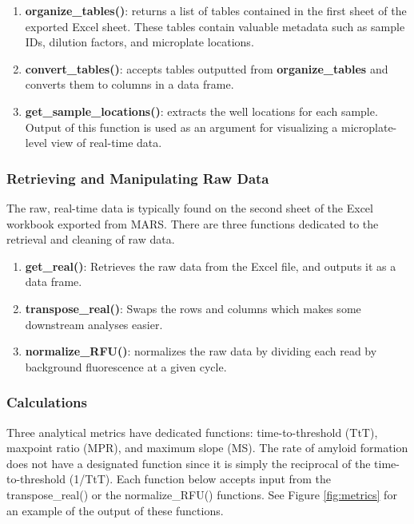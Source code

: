 \documentclass[preprint,12pt,a4paper]{elsarticle}
\begin{document}
            \begin{enumerate}
                \item \textbf{organize\_tables()}: returns a list of tables contained in the first sheet of the exported Excel sheet. These tables contain valuable metadata such as sample IDs, dilution factors, and microplate locations.
                \item \textbf{convert\_tables()}: accepts tables outputted from \textbf{organize\_tables} and converts them to columns in a data frame.
                \item \textbf{get\_sample\_locations()}: extracts the well locations for each sample. Output of this function is used as an argument for visualizing a microplate-level view of real-time data.
            \end{enumerate}

        \subsubsection{Retrieving and Manipulating Raw Data}
            The raw, real-time data is typically found on the second sheet of the Excel workbook exported from MARS. There are three functions dedicated to the retrieval and cleaning of raw data.

            \begin{enumerate}
                \item \textbf{get\_real()}: Retrieves the raw data from the Excel file, and outputs it as a data frame.
                \item \textbf{transpose\_real()}: Swaps the rows and columns which makes some downstream analyses easier.
                \item \textbf{normalize\_RFU()}: normalizes the raw data by dividing each read by background fluorescence at a given cycle.
            \end{enumerate}

        \subsubsection{Calculations}
            Three analytical metrics have dedicated functions: time-to-threshold (TtT), maxpoint ratio (MPR), and maximum slope (MS). The rate of amyloid formation does not have a designated function since it is simply the reciprocal of the time-to-threshold (1/TtT). Each function below accepts input from the transpose\_real() or the normalize\_RFU() functions. See Figure \ref{fig:metrics} for an example of the output of these functions.
\end{document}
